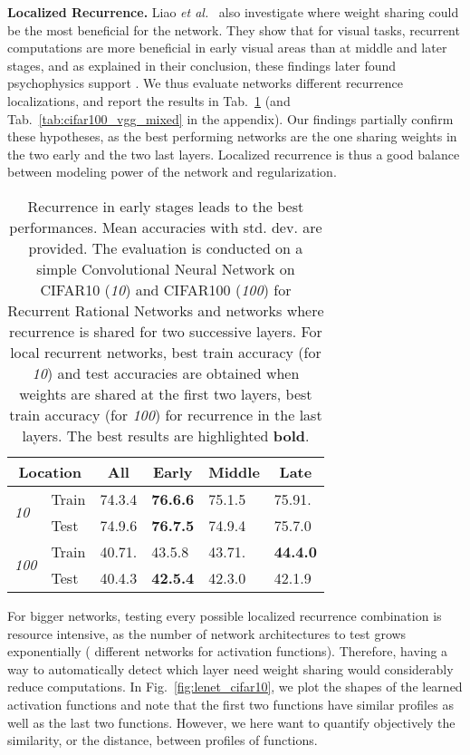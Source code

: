 \documentclass{article}
\newcommand{\etal}{\emph{et al.}~}
\begin{document}
\textbf{Localized Recurrence.}
Liao \etal{} also investigate where weight sharing could be the most beneficial for the network. They show that for visual tasks, recurrent computations are more beneficial in early visual areas than at middle and later stages, and as explained in their conclusion, these findings later found psychophysics support \cite{EberhardtCS16}. We thus evaluate networks different recurrence localizations, and report the results in Tab.~\ref{tab:cifars_lenet_mixed} (and Tab.~\ref{tab:cifar100_vgg_mixed} in the appendix). Our findings partially confirm these hypotheses, as the best performing networks are the one sharing weights in the two early and the two last layers. Localized recurrence is thus a good balance between modeling power of the network and regularization.


\begin{table}[t]
\centering
{\def\arraystretch{1.}\tabcolsep=5.5pt
\begin{tabular}{|l|l|l|l|l|l|}
\hline
\multicolumn{2}{|c|}{Location}    & \multicolumn{1}{c|}{All}     & \multicolumn{1}{c|}{Early}    & \multicolumn{1}{c|}{Middle}     & \multicolumn{1}{c|}{Late}     \\ \hline
\multirow{2}{*}{\textit{10}}  & Train  & 74.3.4 & \textbf{76.6.6} & 75.1.5  & 75.91. \\ \cline{2-6}
                & Test   & 74.9.6 & \textbf{76.7.5} & 74.9.4  & 75.7.0  \\ \hline
\multirow{2}{*}{\textit{100}} & Train  & 40.71. & 43.5.8 & 43.71. & \textbf{44.4.0}  \\ \cline{2-6}
                & Test   & 40.4.3 & \textbf{42.5.4} & 42.3.0  & 42.1.9 \\ \hline
\end{tabular}
}
\caption{Recurrence in early stages leads to the best performances. Mean accuracies with std. dev. are provided. The evaluation is conducted on a simple Convolutional Neural Network on CIFAR10 (\textit{10}) and CIFAR100 (\textit{100}) for Recurrent Rational Networks and networks where recurrence is shared for two successive layers. For local recurrent networks, best train accuracy (for \textit{10}) and test accuracies are obtained when weights are shared at the first two layers, best train accuracy (for \textit{100}) for recurrence in the last layers. The best results are highlighted \textbf{bold}.}
   \label{tab:cifars_lenet_mixed}
\end{table}

For bigger networks, testing every possible localized recurrence combination is resource intensive, as the number of network architectures to test grows exponentially ( different networks for  activation functions). Therefore, having a way to automatically detect which layer need weight sharing would considerably reduce computations. In Fig.~\ref{fig:lenet_cifar10}, we plot the shapes of the learned activation functions and note that the first two functions have similar profiles as well as the last two functions. However, we here want to quantify objectively the similarity, or the distance, between profiles of functions.
\end{document}
